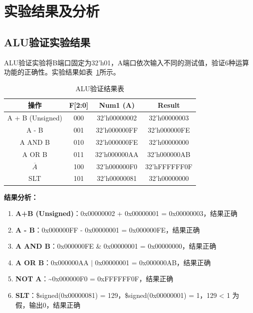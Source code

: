 \section{实验结果及分析}

\subsection{ALU验证实验结果}

ALU验证实验将B端口固定为32'h01，A端口依次输入不同的测试值，验证6种运算功能的正确性。实验结果如表~\ref{tab:alu_result}所示。

\begin{table}[htbp]
    \centering
    \begin{tabular}{c|c|c|c}
        操作 & F[2:0] & Num1 (A) & Result \\
        \hline
        A + B (Unsigned) & 000 & 32'h00000002 & 32'h00000003 \\
        A - B            & 001 & 32'h000000FF & 32'h000000FE \\
        A AND B          & 010 & 32'h000000FE & 32'h00000000 \\
        A OR B           & 011 & 32'h000000AA & 32'h000000AB \\
        $\overline{A}$   & 100 & 32'h000000F0 & 32'hFFFFFF0F \\
        SLT              & 101 & 32'h00000081 & 32'h00000000 \\
        \hline
    \end{tabular}
    \caption{ALU验证结果表}
    \label{tab:alu_result}
\end{table}

\textbf{结果分析：}
\begin{enumerate}
    \item \textbf{A+B (Unsigned)}：0x00000002 + 0x00000001 = 0x00000003，结果正确
    \item \textbf{A - B}：0x000000FF - 0x00000001 = 0x000000FE，结果正确
    \item \textbf{A AND B}：0x000000FE \& 0x00000001 = 0x00000000，结果正确
    \item \textbf{A OR B}：0x000000AA $\vert$ 0x00000001 = 0x000000AB，结果正确
    \item \textbf{NOT A}：\textasciitilde 0x000000F0 = 0xFFFFFF0F，结果正确
    \item \textbf{SLT}：\$signed(0x00000081) = 129，\$signed(0x00000001) = 1，129 < 1 为假，输出0，结果正确
\end{enumerate}

